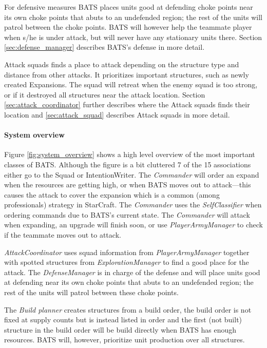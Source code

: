 For defensive measures BATS places units good at defending choke points near its own choke points
that abuts to an undefended region; the rest of the units will patrol between the choke points. BATS
will however help the teammate player when s/he is under attack, but will never have any stationary
units there. Section \ref{sec:defense_manager}  describes BATS's
defense in more detail.

Attack squads finds a place to attack depending on the structure type and distance from other
attacks. It prioritizes important structures, such as newly created Expansions. The squad will
retreat when the enemy squad is too strong, or if it destroyed all structures near the attack
location. Section \ref{sec:attack_coordinator}  further describes
where the Attack squads finds their location and \ref{sec:attack_squad} 
describes Attack squads in more detail.

\paragraph{System overview}
Figure \ref{fig:system_overview} shows a high level overview of the most important classes of BATS. Although the figure is a bit cluttered 7 of the 15 associations either go to the Squad or IntentionWriter. The \emph{Commander} will order an expand when the resources are getting high, or when BATS moves out to attack—this causes the attack to cover the expansion which is a common (among professionals) strategy in StarCraft\cite{day9}. The \emph{Commander} uses the \emph{SelfClassifier} when ordering commands due to BATS's current state. The \emph{Commander} will attack when expanding, an upgrade will finish soon, or use \emph{PlayerArmyManager} to check if the teammate moves out to attack.

\emph{AttackCoordinator} uses squad information from \emph{PlayerArmyManager} together with spotted structures from \emph{ExplorationManager} to find a good place for the attack. The \emph{DefenseManager} is in charge of the defense and will place units good at defending near its own choke points that abuts to an undefended region; the rest of the units will patrol between these choke points.

The \emph{Build planner} creates structures from a build order, the build order is not fixed at supply counts but is instead listed in order and the first (not built) structure in the build order will be build directly when BATS has enough resources. BATS will, however, prioritize unit production over all structures.

